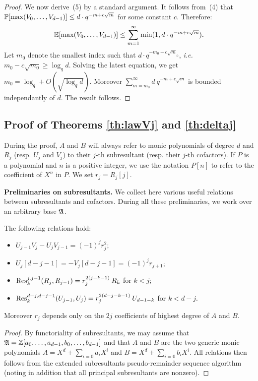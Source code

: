\documentclass{article}
\begin{document}
\begin{proof}
We now derive~(5) by a standard argument. It follows from~(4) that
$\P[\max(V_0, \ldots, V_{d-1})] \leq d \cdot q^{-m + c\sqrt m}$
for some constant $c$. Therefore:
$$\E[\max(V_0, \ldots, V_{d-1})] \leq \sum_{m=1}^\infty \min(1,
d \cdot q^{-m + c\sqrt m}).$$
Let $m_0$ denote the smallest index such that $d \cdot q^{-m_0 + c\sqrt 
m_0}$, \emph{i.e.} $m_0 - c \sqrt{m_0} \geq \log_q d$. Solving the latest
equation, we get $m_0 = \log_q + O(\sqrt{\log_q d})$. Moreover
$\sum_{m=m_0}^\infty d\: q^{-m + c\sqrt m}$ is bounded independantly of
$d$. The result follows.
\end{proof}

\subsection{Proof of Theorems \ref{th:lawVj} and \ref{th:deltaj}}
\label{subsec:proof}

During the proof, $A$ and $B$ will always refer to monic polynomials of 
degree $d$ and $R_j$ (resp. $U_j$ and $V_j$) to their $j$-th 
subresultant (resp. their $j$-th cofactors). If $P$ is a polynomial and 
$n$ is a positive integer, we use the notation $P[n]$ to refer to the 
coefficient of $X^n$ in $P$. We set $r_j = R_j[j]$.

\medskip

\noindent
\textbf{Preliminaries on subresultants.}
We collect here various useful relations between subresultants and 
cofactors. During all these preliminaries, we work over an arbitrary
base $\ring$.

\begin{prop}
\label{prop:relations}
The following relations hold:
\begin{itemize}
\setlength\itemsep{0.1em}
\item $U_{j-1} V_j - U_j V_{j-1} = (-1)^j r_j^2$;
\item $U_j[d{-}j{-}1] = -V_j[d{-}j{-}1] = (-1)^j r_{j+1}$;
\item $\Res^{j,j-1}_k(R_j, R_{j-1}) = r_j^{2(j-k-1)} \: R_k$ for $k < j$;
\item $\Res^{d-j,d-j-1}_k(U_{j-1}, U_j) = r_j^{2(d-j-k-1)} \: U_{d-1-k}$
for $k < d-j$.
\end{itemize}
Moreover $r_j$ depends only on the $2j$ coefficients of highest 
degree of $A$ and $B$.
\end{prop}

\begin{proof}
By functoriality of subresultants, we may assume that $\ring = 
\Z[a_0, \ldots, a_{d-1}, b_0, \ldots, b_{d-1}]$ and that $A$ and $B$
are the two generic monic polynomials 
$A = X^d + \sum_{i=0} a_i X^i$ and
$B = X^d + \sum_{i=0} b_i X^i$.
All relations then follows from the extended subresultants 
pseudo-remainder sequence algorithm (noting in addition that all
principal subresultants are nonzero).
\end{proof}
\end{document}
